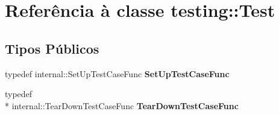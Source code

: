 \hypertarget{classtesting_1_1Test}{\section{Referência à classe testing\-:\-:Test}
\label{classtesting_1_1Test}
}
\subsection*{Tipos Públicos}
\begin{DoxyCompactItemize}
\item 
\hypertarget{classtesting_1_1Test_a5f2a051d1d99c9b784c666c586186cf9}{typedef internal\-::\-Set\-Up\-Test\-Case\-Func {\bfseries Set\-Up\-Test\-Case\-Func}}\label{classtesting_1_1Test_a5f2a051d1d99c9b784c666c586186cf9}

\item 
\hypertarget{classtesting_1_1Test_aa0f532e93b9f3500144c53f31466976c}{typedef \\*
internal\-::\-Tear\-Down\-Test\-Case\-Func {\bfseries Tear\-Down\-Test\-Case\-Func}}\label{classtesting_1_1Test_aa0f532e93b9f3500144c53f31466976c}

\end{DoxyCompactItemize}
